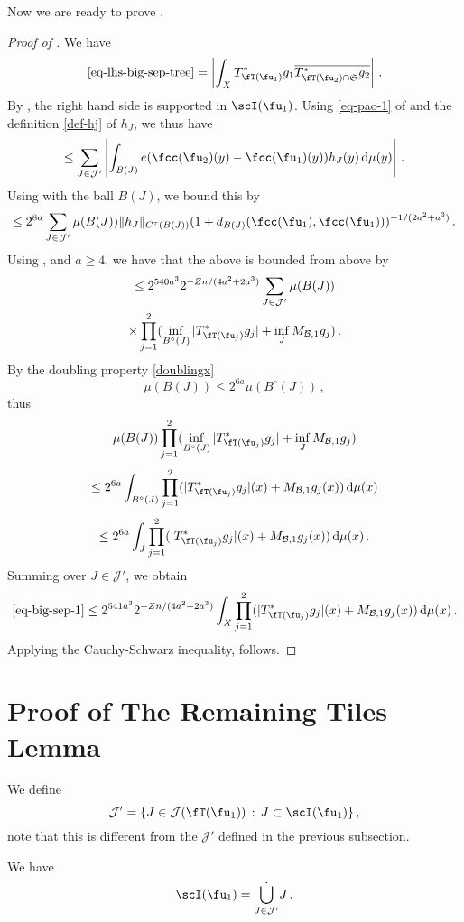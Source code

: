     Now we are ready to prove .
    \begin{proof}[Proof of ]
    We have
    $$
        \eqref{eq-lhs-big-sep-tree} = \left| \int_{X} T_{\fT(\fu_1)}^* g_1 \overline{T_{\fT(\fu_2) \cap \mathfrak{S}}^* g_2 }\right|\,.
    $$
    By , the right hand side is supported in $\scI(\fu_1)$. Using \eqref{eq-pao-1} of  and the definition \eqref{def-hj} of $h_J$, we thus have
    $$
        \le \sum_{J \in \mathcal{J}'} \left|\int_{B(J)} e(\fcc(\fu_2)(y) - \fcc(\fu_1)(y)) h_J(y) \, \mathrm{d}\mu(y) \right|\,.
    $$
    Using  with the ball $B(J)$, we bound this by
    $$
        \le 2^{8a} \sum_{J \in \mathcal{J}'} \mu(B(J)) \|h_J\|_{C^{\tau}(B(J))} (1 + d_{B(J)}(\fcc(\fu_1), \fcc(\fu_1)))^{-1/(2a^2+a^3)}\,.
    $$
    Using ,  and $a \ge 4$, we have that the above is bounded from above by
    \begin{multline}
        \label{eq-big-sep-1}
        \le 2^{540a^3} 2^{-Zn/(4a^2 + 2a^3)} \sum_{J \in \mathcal{J}'} \mu(B(J)) \\
        \times \prod_{j=1}^2 (\inf_{B^\circ{}(J)} |T_{\fT(\fu_j)}^* g_j| + \inf_J M_{\mathcal{B},1} g_j)\,.
    \end{multline}
    By the doubling property \eqref{doublingx}
    $$
        \mu(B(J)) \le 2^{6a} \mu(B^\circ{}(J))\,,
    $$
    thus
    $$
        \mu(B(J)) \prod_{j=1}^2 (\inf_{B^\circ{}(J)} |T_{\fT(\fu_j)}^* g_j| + \inf_J M_{\mathcal{B},1} g_j)
    $$
    $$
        \le 2^{6a} \int_{B^\circ{}(J)} \prod_{j=1}^2 ( |T_{\fT(\fu_j)}^* g_j|(x) + M_{\mathcal{B},1} g_j(x)) \, \mathrm{d}\mu(x)
    $$
    $$
        \le 2^{6a} \int_J \prod_{j=1}^2 ( |T_{\fT(\fu_j)}^* g_j|(x) + M_{\mathcal{B},1} g_j(x)) \, \mathrm{d}\mu(x)\,.
    $$
    Summing over $J \in \mathcal{J}'$, we obtain
    $$
        \eqref{eq-big-sep-1} \le 2^{541a^3} 2^{-Zn/(4a^2 + 2a^3)} \int_X \prod_{j=1}^2 ( |T_{\fT(\fu_j)}^* g_j|(x) + M_{\mathcal{B},1} g_j(x)) \, \mathrm{d}\mu(x)\,.
    $$
    Applying the Cauchy-Schwarz inequality,  follows.
    \end{proof}

\section{Proof of The Remaining Tiles Lemma}
    \label{subsec-rest-tiles}
    We define
    $$
        \mathcal{J}' = \{J \in \mathcal{J}(\fT(\fu_1)) \, : \, J \subset \scI(\fu_1)\}\,,
    $$
    note that this is different from the $\mathcal{J}'$ defined in the previous subsection.
    \begin{lemma}
        \label{dyadic-partition-2}
        We have
        $$
            \scI(\fu_1) = \dot{\bigcup_{J \in \mathcal{J}'}} J\,.
        $$
    \end{lemma}

